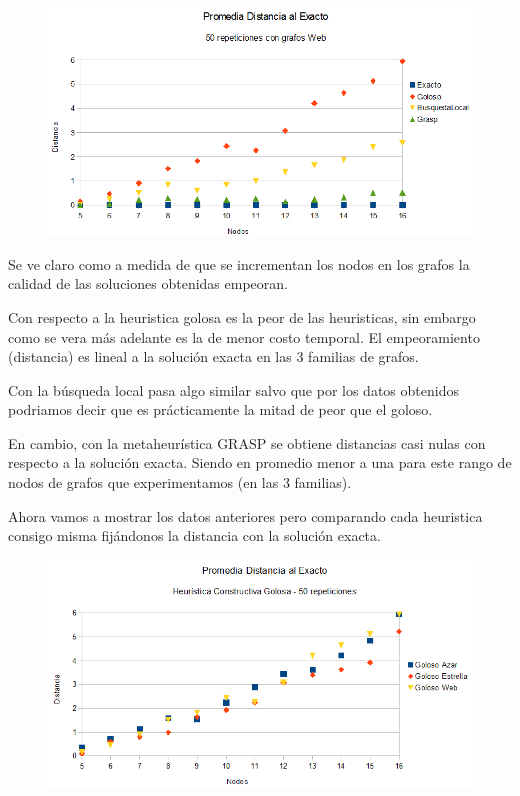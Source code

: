\begin{figure}[H]
	\centering
	\includegraphics[scale=0.6]{distancia-Web.png}
\end{figure}

\quad Se ve claro como a medida de que se incrementan los nodos en los grafos la calidad de las soluciones obtenidas empeoran.

\quad Con respecto a la heuristica golosa es la peor de las heuristicas, sin embargo como se vera más adelante es la de menor costo temporal. El empeoramiento (distancia) es lineal a la solución exacta en las 3 familias de grafos.

\quad Con la búsqueda local pasa algo similar salvo que por los datos obtenidos podriamos decir que es prácticamente la mitad de peor que el goloso. 

\quad En cambio, con la metaheurística GRASP se obtiene distancias casi nulas con respecto a la solución exacta. Siendo en promedio menor a una para este rango de nodos de grafos que experimentamos (en las 3 familias).

\quad

\quad Ahora vamos a mostrar los datos anteriores pero comparando cada heuristica consigo misma fijándonos la distancia con la solución exacta.

\begin{figure}[H]
	\centering
	\includegraphics[scale=0.6]{distancia-Goloso.png}
\end{figure}

